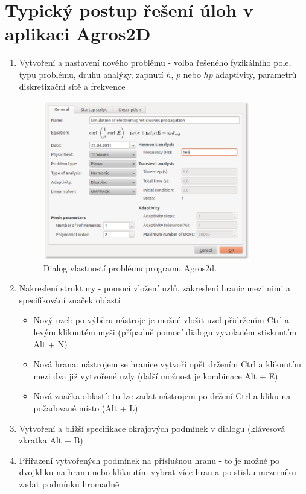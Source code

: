 \section{Typický postup řešení úloh v aplikaci Agros2D}
\begin{enumerate}
\item Vytvoření a nastavení nového problému - volba řešeného fyzikálního pole, typu problému, druhu analýzy, zapnutí $h$, $p$ nebo $hp$ adaptivity, parametrů diskretizační sítě a frekvence
\begin{figure}[!h]
	\centering
	\includegraphics[width=9cm]{sim_problem_properties.png}
	\caption{Dialog vlastností problému programu Agros2d.}
	\label{obr:sim_problem_properties}
\end{figure}
\item Nakreslení struktury - pomocí vložení uzlů, zakreslení hranic mezi nimi a specifikování značek oblastí
\begin{itemize}
\item Nový uzel: po výběru nástroje  je možné vložit uzel přidržením Ctrl a levým kliknutém myši (případně pomocí dialogu vyvolaném stisknutím Alt + N)
\item Nová hrana: nástrojem  se hranice vytvoří opět držením Ctrl a kliknutím mezi dva již vytvořené uzly (další možnost je kombinace Alt + E)
\item Nová značka oblastí: tu lze zadat nástrojem  po držení Ctrl a kliku na požadované místo (Alt + L)
\end{itemize}
\item Vytvoření a bližší specifikace okrajových podmínek v dialogu  (klávesová zkratka Alt + B)
\item Přiřazení vytvořených podmínek na příslušnou hranu - to je možné po dvojkliku na hranu nebo kliknutím vybrat více hran a po stisku mezerníku zadat podmínku hromadně

\end{enumerate}
